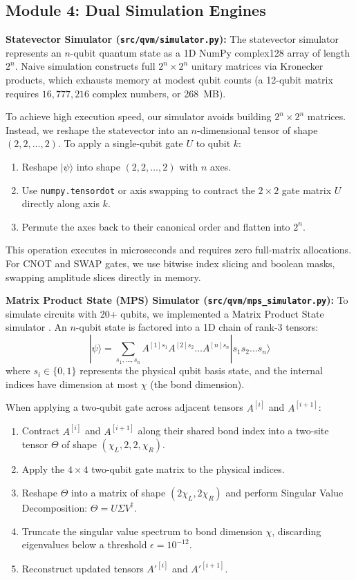 \subsection{Module 4: Dual Simulation Engines}

\textbf{Statevector Simulator (\texttt{src/qvm/simulator.py}):}
The statevector simulator represents an $n$-qubit quantum state as a 1D NumPy complex128 array of length $2^n$. Naive simulation constructs full $2^n \times 2^n$ unitary matrices via Kronecker products, which exhausts memory at modest qubit counts (a 12-qubit matrix requires $16,777,216$ complex numbers, or 268~MB).

To achieve high execution speed, our simulator avoids building $2^n \times 2^n$ matrices. Instead, we reshape the statevector into an $n$-dimensional tensor of shape $(2, 2, \dots, 2)$. To apply a single-qubit gate $U$ to qubit $k$:
\begin{enumerate}[leftmargin=*]
    \item Reshape $|\psi\rangle$ into shape $(2, 2, \dots, 2)$ with $n$ axes.
    \item Use \texttt{numpy.tensordot} or axis swapping to contract the $2 \times 2$ gate matrix $U$ directly along axis $k$.
    \item Permute the axes back to their canonical order and flatten into $2^n$.
\end{enumerate}
This operation executes in microseconds and requires zero full-matrix allocations. For CNOT and SWAP gates, we use bitwise index slicing and boolean masks, swapping amplitude slices directly in memory.

\textbf{Matrix Product State (MPS) Simulator (\texttt{src/qvm/mps\_simulator.py}):}
To simulate circuits with 20+ qubits, we implemented a Matrix Product State simulator \cite{vidal2003mps}. An $n$-qubit state is factored into a 1D chain of rank-3 tensors:
\begin{equation}
|\psi\rangle = \sum_{s_1, \dots, s_n} A^{[1] s_1} A^{[2] s_2} \dots A^{[n] s_n} |s_1 s_2 \dots s_n\rangle
\end{equation}
where $s_i \in \{0, 1\}$ represents the physical qubit basis state, and the internal indices have dimension at most $\chi$ (the bond dimension).

When applying a two-qubit gate across adjacent tensors $A^{[i]}$ and $A^{[i+1]}$:
\begin{enumerate}[leftmargin=*]
    \item Contract $A^{[i]}$ and $A^{[i+1]}$ along their shared bond index into a two-site tensor $\Theta$ of shape $(\chi_L, 2, 2, \chi_R)$.
    \item Apply the $4 \times 4$ two-qubit gate matrix to the physical indices.
    \item Reshape $\Theta$ into a matrix of shape $(2\chi_L, 2\chi_R)$ and perform Singular Value Decomposition: $\Theta = U \Sigma V^\dagger$.
    \item Truncate the singular value spectrum to bond dimension $\chi$, discarding eigenvalues below a threshold $\epsilon = 10^{-12}$.
    \item Reconstruct updated tensors $A'^{[i]}$ and $A'^{[i+1]}$.
\end{enumerate}

